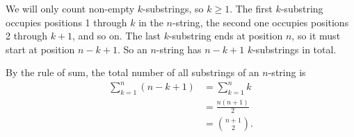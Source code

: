 We will only count non-empty $k$-substrings, so $k\ge1$.
The first $k$-substring occupies positions 1 through $k$ in the $n$-string, the second one occupies positions 2 through $k+1$, and so on.
The last $k$-substring ends at position $n$, so it must start at position $n-k+1$.
So an $n$-string has $n-k+1$ $k$-substrings in total.

By the rule of sum, the total number of all substrings of an $n$-string is
\begin{align*}
    \sum_{k=1}^n(n-k+1) &= \sum_{k=1}^nk \\[1mm]
    &= \frac{n(n+1)}{2} \tag{by equation (A.1)} \\
    &= \binom{n+1}{2}.
\end{align*}

